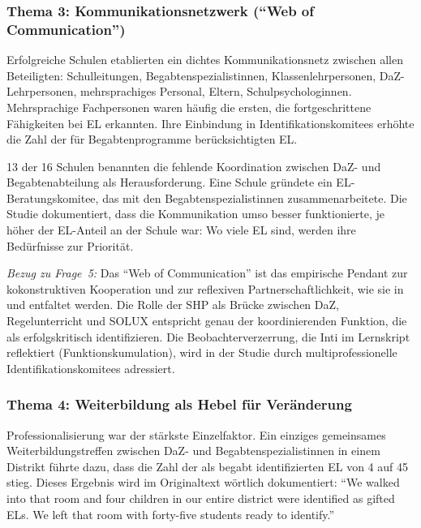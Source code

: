 \documentclass[ngerman, a4paper]{article}
\begin{document}
\subsubsection*{Thema 3: Kommunikationsnetzwerk (\enquote{Web of
    Communication})}

Erfolgreiche Schulen etablierten ein dichtes Kommunikationsnetz zwischen
allen Beteiligten: Schulleitungen, Begabtenspezialistinnen,
Klassenlehrpersonen, DaZ-Lehrpersonen, mehrsprachiges Personal, Eltern,
Schulpsychologinnen. Mehrsprachige Fachpersonen waren häufig die ersten,
die fortgeschrittene Fähigkeiten bei EL erkannten. Ihre Einbindung in
Identifikationskomitees erhöhte die Zahl der für Begabtenprogramme
berücksichtigten EL.

13 der 16 Schulen benannten die fehlende Koordination zwischen DaZ- und
Begabtenabteilung als Herausforderung. Eine Schule gründete ein
EL-Beratungskomitee, das mit den Begabtenspezialistinnen
zusammenarbeitete. Die Studie dokumentiert, dass die Kommunikation umso
besser funktionierte, je höher der EL-Anteil an der Schule war: Wo viele
EL sind, werden ihre Bedürfnisse zur Priorität.

\textit{Bezug zu Frage~5:} Das \enquote{Web of Communication} ist das
empirische Pendant zur kokonstruktiven Kooperation und zur reflexiven
Partnerschaftlichkeit, wie sie in
\parencite[S.\,469--471]{groschefussangelgraesel2020kokonstruktion} und
\parencite[S.\,308\psq]{widmerwolf2018multiprofessionell} entfaltet werden. Die Rolle der SHP als Brücke
zwischen DaZ, Regelunterricht und SOLUX entspricht genau der
koordinierenden Funktion, die \textcite{gubbins2020promising} als
erfolgskritisch identifizieren. Die Beobachterverzerrung, die Inti im
Lernskript reflektiert (Funktionskumulation), wird in der Studie durch
multiprofessionelle Identifikationskomitees adressiert.

\subsubsection*{Thema 4: Weiterbildung als Hebel für Veränderung}

Professionalisierung war der stärkste Einzelfaktor. Ein einziges
gemeinsames Weiterbildungstreffen zwischen DaZ- und
Begabtenspezialistinnen in einem Distrikt führte dazu, dass die Zahl der
als begabt identifizierten EL von 4 auf 45 stieg. Dieses Ergebnis wird im
Originaltext wörtlich dokumentiert: \enquote{We walked into that room and
  four children in our entire district were identified as gifted ELs. We
  left that room with forty-five students ready to identify.}
\end{document}
